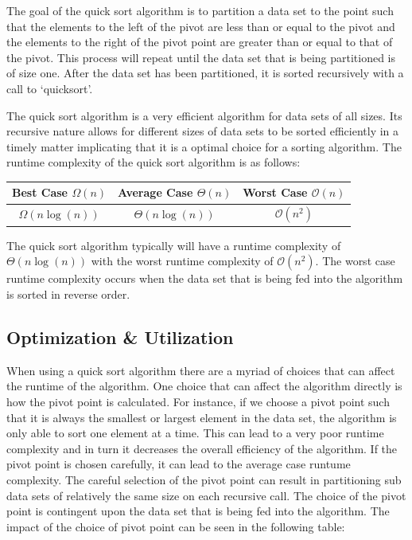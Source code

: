 \documentclass[a4paper,9pt]{article}
\begin{document}
\begin{highlight}
    \noindent The goal of the quick sort algorithm is to partition a data set to the point such that the elements to the left of the pivot are less than or equal to the pivot and the elements to the right of the pivot point are greater than or equal to that of the pivot. This process will repeat until the data set that is being partitioned is of size one.
    After the data set has been partitioned, it is sorted recursively with a call to `quicksort'.

    The quick sort algorithm is a very efficient algorithm for data sets of all sizes. Its recursive nature allows for different sizes of data sets to be sorted efficiently in a timely matter implicating that it is a optimal choice for a sorting algorithm. The runtime complexity of the quick sort algorithm is as follows:

    \begin{center}
        \begin{tabular}{|c|c|c|}
            \hline \textbf{Best Case $\Omega(n)$} & \textbf{Average Case $\Theta(n)$} & \textbf{Worst Case $\mathcal{O}(n)$} \\ \hline
            $\Omega(n\log{(n)})$ & $\Theta(n\log{(n)})$ & $\mathcal{O}(n^2)$ \\ \hline
        \end{tabular}
    \end{center}

    \noindent The quick sort algorithm typically will have a runtime complexity of $\Theta(n\log{(n)})$ with the worst runtime complexity of $\mathcal{O}(n^2)$. The worst case runtime complexity occurs when the data set that is being fed into the algorithm is sorted in reverse order.
\end{highlight}

\subsection*{Optimization \& Utilization}

When using a quick sort algorithm there are a myriad of choices that can affect the runtime of the algorithm. One choice that can affect the algorithm directly is how the pivot point is calculated. For instance, if we choose a pivot point such that it is always the smallest or largest element in the data set, the algorithm is only able to sort one element at a time.
This can lead to a very poor runtime complexity and in turn it decreases the overall efficiency of the algorithm. If the pivot point is chosen carefully, it can lead to the average case runtume complexity. The careful selection of the pivot point can result in partitioning sub data sets of relatively the same size on each recursive call. The choice of the pivot point is contingent upon the data set that is being fed into the algorithm. The impact of the choice of pivot point can be seen in the following table:
\end{document}
